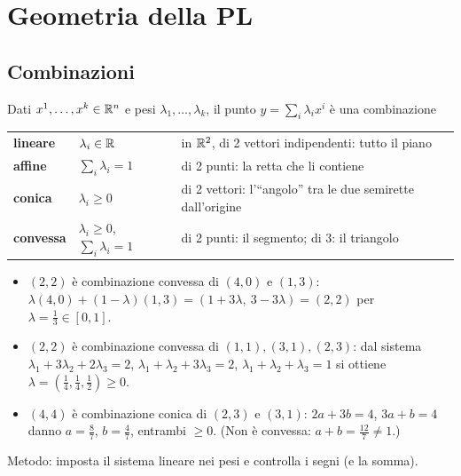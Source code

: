 \section{Geometria della PL}

\subsection{Combinazioni}
Dati $x^1,\dots,x^k\in\mathbb{R}^n$ e pesi $\lambda_1,\dots,\lambda_k$, il punto $y=\sum_i\lambda_ix^i$ è una combinazione
\begin{center}
\begin{tabular}{@{}lll@{}}
\toprule
\textbf{lineare} & $\lambda_i\in\mathbb{R}$ & in $\mathbb{R}^2$, di 2 vettori indipendenti: tutto il piano\\
\textbf{affine} & $\sum_i\lambda_i=1$ & di 2 punti: la retta che li contiene\\
\textbf{conica} & $\lambda_i\ge0$ & di 2 vettori: l'``angolo'' tra le due semirette dall'origine\\
\textbf{convessa} & $\lambda_i\ge0$, $\sum_i\lambda_i=1$ & di 2 punti: il segmento; di 3: il triangolo\\
\bottomrule
\end{tabular}
\end{center}

\begin{esbox}
\begin{itemize}[nosep]
\item $(2,2)$ è combinazione convessa di $(4,0)$ e $(1,3)$: $\lambda(4,0)+(1-\lambda)(1,3)=(1+3\lambda,\ 3-3\lambda)=(2,2)$ per $\lambda=\tfrac13\in[0,1]$.
\item $(2,2)$ è combinazione convessa di $(1,1),(3,1),(2,3)$: dal sistema $\lambda_1+3\lambda_2+2\lambda_3=2$, $\lambda_1+\lambda_2+3\lambda_3=2$, $\lambda_1+\lambda_2+\lambda_3=1$ si ottiene $\lambda=(\tfrac14,\tfrac14,\tfrac12)\ge0$.
\item $(4,4)$ è combinazione conica di $(2,3)$ e $(3,1)$: $2a+3b=4$, $3a+b=4$ danno $a=\tfrac87$, $b=\tfrac47$, entrambi $\ge0$. (Non è convessa: $a+b=\tfrac{12}{7}\ne1$.)
\end{itemize}
Metodo: imposta il sistema lineare nei pesi e controlla i segni (e la somma).
\end{esbox}

